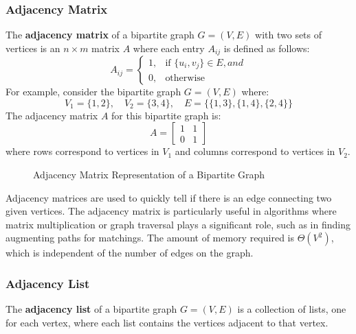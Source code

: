 \subsubsection*{Adjacency Matrix}
The \textbf{adjacency matrix} of a bipartite graph \( G = (V, E) \) with two sets of vertices is an \( n \times m \) matrix \( A \) where each entry \( A_{ij} \) is defined as follows:
\[
A_{ij} =
\begin{cases}
1, & \text{if } \{u_i, v_j\} \in E, and \\
0, & \text{otherwise}
\end{cases}
\]
For example, consider the bipartite graph \( G = (V, E) \) where:
\[
V_1 = \{1, 2\}, \quad V_2 = \{3, 4\}, \quad E = \{\{1, 3\}, \{1, 4\}, \{2, 4\}\}
\]
The adjacency matrix \( A \) for this bipartite graph is:
\[
A =
\begin{bmatrix}
1 & 1 \\
0 & 1 
\end{bmatrix}
\]
where rows correspond to vertices in \( V_1 \) and columns correspond to vertices in \( V_2 \).

\begin{figure}[h]
\begin{center}
\caption{Adjacency Matrix Representation of a Bipartite Graph}
\label{fig:adj_matrix}
\end{center}
\end{figure}

Adjacency matrices are used to quickly tell if there is an edge connecting two given vertices. The adjacency matrix is particularly useful in algorithms where matrix multiplication or graph traversal plays a significant role, such as in finding augmenting paths for matchings. The amount of memory required is $\Theta(V^2)$, which is independent of the number of edges on the graph.

\subsubsection*{Adjacency List}
The \textbf{adjacency list} of a bipartite graph \( G = (V, E) \) is a collection of lists, one for each vertex, where each list contains the vertices adjacent to that vertex.

